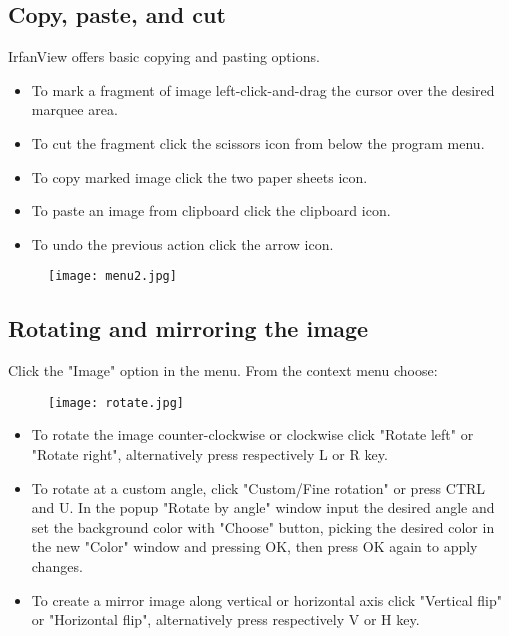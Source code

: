 \documentclass[
	fontsize=10pt, 
	twoside=true, 
	numbers=noenddot, 
]{kaobook}
\begin{document}
\subsection{Copy, paste, and cut}
\par IrfanView offers  basic copying and pasting options.
\begin{itemize}
    \item To mark a fragment of image left-click-and-drag the cursor over the desired marquee area.
    \item To cut the fragment click the scissors icon from below the program menu.
    \item To copy marked image click the two paper sheets icon.
    \item To paste an image from clipboard click the clipboard icon.
    \item To undo the previous action click the arrow icon.
\end{itemize}
\begin{figure}[h]
    \centering
    \texttt{[image: menu2.jpg]}
    \label{IrfanView menu}
\end{figure}

\subsection{Rotating and mirroring the image}
\par Click the "Image" option in the menu. From the context menu choose:
\begin{figure}[!]
    \centering
    \texttt{[image: rotate.jpg]}
\end{figure}
\begin{itemize}
    \item To rotate the image counter-clockwise or clockwise click "Rotate left" or "Rotate right", alternatively press respectively L or R key.
    \item To rotate at a custom angle, click "Custom/Fine rotation" or press CTRL and U. In the popup "Rotate by angle" window input the desired angle and set the background color with "Choose" button, picking the desired color in the new "Color" window and pressing OK, then press OK again to apply changes.
    \item To create a mirror image along vertical or horizontal axis click "Vertical flip" or "Horizontal flip", alternatively press respectively V or H key.
\end{itemize}
\end{document}

